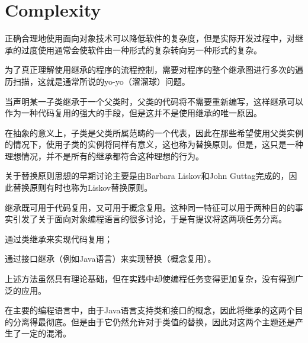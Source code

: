 \section{Complexity}

正确合理地使用面向对象技术可以降低软件的复杂度，但是实际开发过程中，对继承的过度使用通常会使软件由一种形式的复杂转向另一种形式的复杂。

为了真正理解使用继承的程序的流程控制，需要对程序的整个继承图进行多次的遍历扫描，这就是通常所说的yo-yo（溜溜球）问题。

当声明某一子类继承于一个父类时，父类的代码将不需要重新编写，这样继承可以作为一种代码复用的强大的手段，但是这并不是使用继承的唯一原因。

在抽象的意义上，子类是父类所属范畴的一个代表，因此在那些希望使用父类实例的情况下，使用子类的实例将同样有意义，这也称为替换原则。但是，这只是一种理想情况，并不是所有的继承都符合这种理想的行为。

关于替换原则思想的早期讨论主要是由Barbara Liskov和John Guttag完成的，因此替换原则有时也称为Liskov替换原则。


继承既可用于代码复用，又可用于概念复用。这种同一特征可以用于两种目的的事实引发了关于面向对象编程语言的很多讨论，于是有提议将这两项任务分离。

\begin{compactitem}
\item 通过类继承来实现代码复用；
\item 通过接口继承（例如Java语言）来实现替换（概念复用）。
\end{compactitem}

上述方法虽然具有理论基础，但在实践中却使编程任务变得更加复杂，没有得到广泛的应用。

在主要的编程语言中，由于Java语言支持类和接口的概念，因此将继承的这两个目的分离得最彻底。但是由于它仍然允许对于类值的替换，因此对这两个主题还是产生了一定的混淆。

\begin{lstlisting}[language=C++]

\end{lstlisting}





\begin{lstlisting}[language=C++]

\end{lstlisting}





\begin{lstlisting}[language=C++]

\end{lstlisting}




